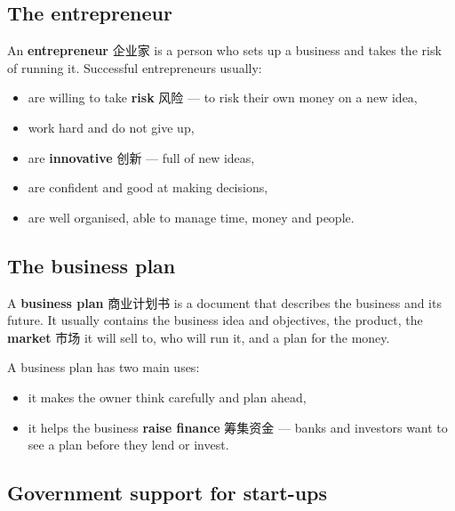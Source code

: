 \documentclass[11pt]{article}
\begin{document}
\subsection*{The entrepreneur}

An \textbf{entrepreneur} 企业家 is a person who sets up a business and takes the risk of running it. Successful entrepreneurs usually:

\begin{itemize}
\item are willing to take \textbf{risk} 风险 — to risk their own money on a new idea,

\item work hard and do not give up,

\item are \textbf{innovative} 创新 — full of new ideas,

\item are confident and good at making decisions,

\item are well organised, able to manage time, money and people.

\end{itemize}

\subsection*{The business plan}

A \textbf{business plan} 商业计划书 is a document that describes the business and its future. It usually contains the business idea and objectives, the product, the \textbf{market} 市场 it will sell to, who will run it, and a plan for the money.

A business plan has two main uses:

\begin{itemize}
\item it makes the owner think carefully and plan ahead,

\item it helps the business \textbf{raise finance} 筹集资金 — banks and investors want to see a plan before they lend or invest.

\end{itemize}

\subsection*{Government support for start-ups}
\end{document}
